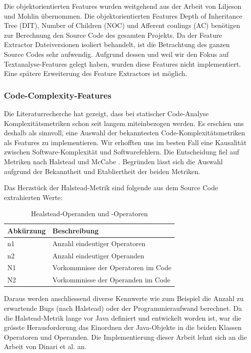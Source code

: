 \documentclass[10pt, a4paper]{article}
\begin{document}
Die objektorientierten Features wurden weitgehend aus der Arbeit von Liljeson und Mohlin \cite{Liljeson831487} übernommen. Die objektorientierten Features Depth of Inheritance Tree (DIT), Number of Children (NOC) und Afferent coulings (AC) benötigen zur Berechnung den Source Code des gesamten Projekts. Da der Feature Extractor Dateiversionen isoliert behandelt, ist die Betrachtung des ganzen Source Codes sehr aufwendig. Aufgrund dessen und weil wir den Fokus auf Textanalyse-Features gelegt haben, wurden diese Features nicht implementiert. Eine spätere Erweiterung des Feature Extractors ist möglich.

\subsubsection{Code-Complexity-Features} \label{sec:complexityfeatures}
Die Literaturrecherche hat gezeigt, dass bei statischer Code-Analyse Komplexitätsmetriken schon seit langem miteinbezogen werden. Es erschien uns deshalb als sinnvoll, eine Auswahl der bekanntesten Code-Komplexitätsmetriken als Features zu implementieren. Wir erhofften uns im besten Fall eine Kausalität zwischen Software-Komplexität und Softwarefehlern. Die Entscheidung fiel auf Metriken nach Halstead \cite{Halstead:1977:ESS:540137} und McCabe \cite{mccabe1976}. Begründen lässt sich die Auswahl aufgrund der Bekanntheit und Etabliertheit der beiden Metriken.

Das Herzstück der Halstead-Metrik sind folgende aus dem Source Code extrahierten Werte:

\begin{table}[H]
	\begin{tabular}{l|l}
		\textbf{Abkürzung} & \textbf{Beschreibung}\\
		\hline
		n1 & Anzahl eindeutiger Operatoren\\
		n2 & Anzahl eindeutiger Operanden\\
		N1 & Vorkommnisse der Operatoren im Code\\
		N2 & Vorkommnisse der Operanden im Code\\
	\end{tabular}
	\caption{Healstead-Operanden und -Operatoren}
	\label{tab:halsteadoperands}
\end{table}

Daraus werden anschliessend diverse Kennwerte wie zum Beispiel die Anzahl zu erwartende Bugs (nach Halstead) oder der Programmieraufwand berechnet. Da die Halstead-Metrik lange vor Java definiert und entwickelt worden ist, war die grösste Herausforderung das Einordnen der Java-Objekte in die beiden Klassen Operatoren und Operanden. Die Implementierung dieser Arbeit lehnt sich an die Arbeit von Dinari et al. \cite{halstead:dinari} an.
\end{document}
